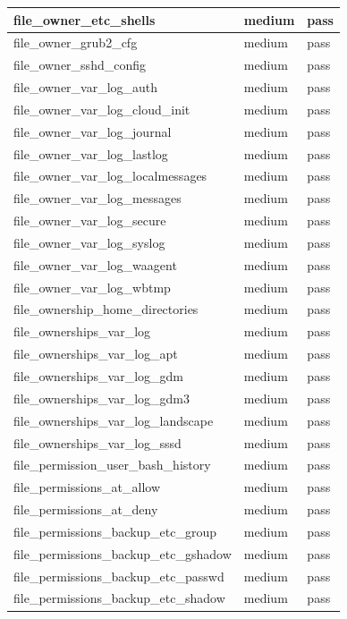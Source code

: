 \begin{longtable}{|p{10cm}|p{2cm}|p{2cm}|}
\hline
file\_owner\_etc\_shells & medium & pass \\
\hline
file\_owner\_grub2\_cfg & medium & pass \\
\hline
file\_owner\_sshd\_config & medium & pass \\
\hline
file\_owner\_var\_log\_auth & medium & pass \\
\hline
file\_owner\_var\_log\_cloud\_init & medium & pass \\
\hline
file\_owner\_var\_log\_journal & medium & pass \\
\hline
file\_owner\_var\_log\_lastlog & medium & pass \\
\hline
file\_owner\_var\_log\_localmessages & medium & pass \\
\hline
file\_owner\_var\_log\_messages & medium & pass \\
\hline
file\_owner\_var\_log\_secure & medium & pass \\
\hline
file\_owner\_var\_log\_syslog & medium & pass \\
\hline
file\_owner\_var\_log\_waagent & medium & pass \\
\hline
file\_owner\_var\_log\_wbtmp & medium & pass \\
\hline
file\_ownership\_home\_directories & medium & pass \\
\hline
file\_ownerships\_var\_log & medium & pass \\
\hline
file\_ownerships\_var\_log\_apt & medium & pass \\
\hline
file\_ownerships\_var\_log\_gdm & medium & pass \\
\hline
file\_ownerships\_var\_log\_gdm3 & medium & pass \\
\hline
file\_ownerships\_var\_log\_landscape & medium & pass \\
\hline
file\_ownerships\_var\_log\_sssd & medium & pass \\
\hline
file\_permission\_user\_bash\_history & medium & pass \\
\hline
file\_permissions\_at\_allow & medium & pass \\
\hline
file\_permissions\_at\_deny & medium & pass \\
\hline
file\_permissions\_backup\_etc\_group & medium & pass \\
\hline
file\_permissions\_backup\_etc\_gshadow & medium & pass \\
\hline
file\_permissions\_backup\_etc\_passwd & medium & pass \\
\hline
file\_permissions\_backup\_etc\_shadow & medium & pass \\

\end{longtable}
